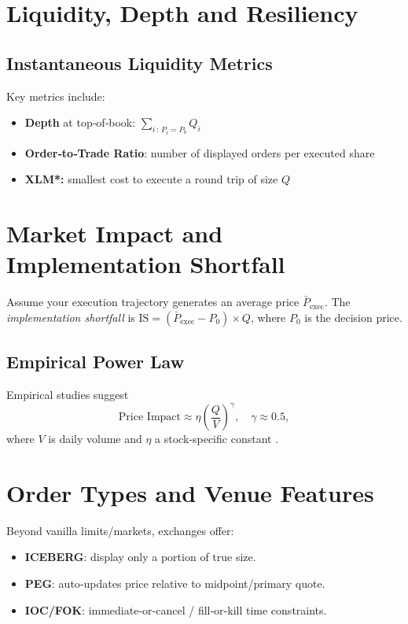 \section{Liquidity, Depth and Resiliency}

\subsection{Instantaneous Liquidity Metrics}
Key metrics include:

\begin{itemize}
  \item \textbf{Depth} at top‑of‑book: \(\sum_{i\,:\,P_i=P_b} Q_i\)
  \item \textbf{Order‑to‑Trade Ratio}: number of displayed orders per executed share
  \item \textbf{XLM*:} smallest cost to execute a round trip of size \(Q\)
\end{itemize}

\section{Market Impact and Implementation Shortfall}

Assume your execution trajectory generates an average price
\(\bar P_{\text{exec}}\).  
The \emph{implementation shortfall} is
\(\text{IS} = (\bar P_{\text{exec}} - P_0) \times Q\),
where \(P_0\) is the decision price.

\subsection{Empirical Power Law}

Empirical studies suggest
\[
\text{Price Impact} \approx \eta \left(\frac{Q}{V}\right)^\gamma,
\quad \gamma \approx 0.5 ,
\]
where \(V\) is daily volume and \(\eta\) a stock‑specific constant
\parencite{almgren2005direct}.

\section{Order Types and Venue Features}

Beyond vanilla limits/markets, exchanges offer:

\begin{itemize}
  \item \textbf{ICEBERG}: display only a portion of true size.
  \item \textbf{PEG}: auto‑updates price relative to midpoint/primary quote.
  \item \textbf{IOC/FOK}: immediate‑or‑cancel / fill‑or‑kill time constraints.
\end{itemize}

